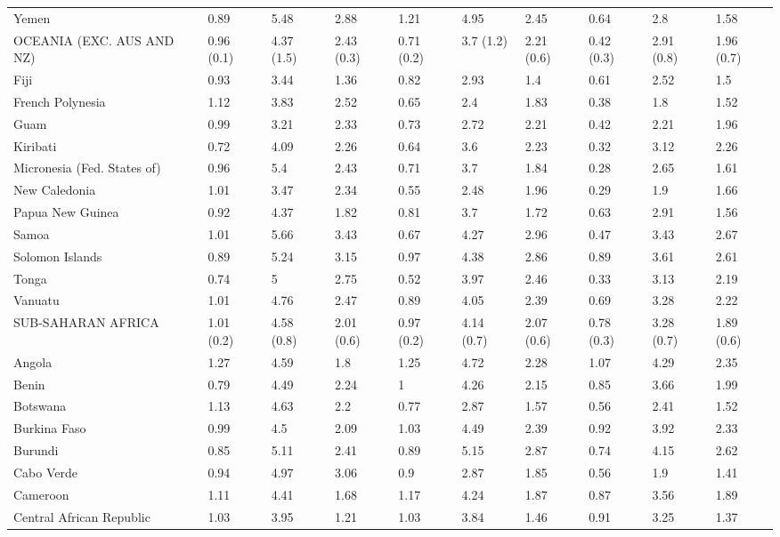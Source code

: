 \begin{longtable}[t]{llllllllll}
Yemen & 0.89 & 5.48 & 2.88 & 1.21 & 4.95 & 2.45 & 0.64 & 2.8 & 1.58\\
OCEANIA (EXC. AUS AND NZ) & 0.96 (0.1) & 4.37 (1.5) & 2.43 (0.3) & 0.71 (0.2) & 3.7 (1.2) & 2.21 (0.6) & 0.42 (0.3) & 2.91 (0.8) & 1.96 (0.7)\\
Fiji & 0.93 & 3.44 & 1.36 & 0.82 & 2.93 & 1.4 & 0.61 & 2.52 & 1.5\\
French Polynesia & 1.12 & 3.83 & 2.52 & 0.65 & 2.4 & 1.83 & 0.38 & 1.8 & 1.52\\
Guam & 0.99 & 3.21 & 2.33 & 0.73 & 2.72 & 2.21 & 0.42 & 2.21 & 1.96\\
Kiribati & 0.72 & 4.09 & 2.26 & 0.64 & 3.6 & 2.23 & 0.32 & 3.12 & 2.26\\
Micronesia (Fed. States of) & 0.96 & 5.4 & 2.43 & 0.71 & 3.7 & 1.84 & 0.28 & 2.65 & 1.61\\
New Caledonia & 1.01 & 3.47 & 2.34 & 0.55 & 2.48 & 1.96 & 0.29 & 1.9 & 1.66\\
Papua New Guinea & 0.92 & 4.37 & 1.82 & 0.81 & 3.7 & 1.72 & 0.63 & 2.91 & 1.56\\
Samoa & 1.01 & 5.66 & 3.43 & 0.67 & 4.27 & 2.96 & 0.47 & 3.43 & 2.67\\
Solomon Islands & 0.89 & 5.24 & 3.15 & 0.97 & 4.38 & 2.86 & 0.89 & 3.61 & 2.61\\
Tonga & 0.74 & 5 & 2.75 & 0.52 & 3.97 & 2.46 & 0.33 & 3.13 & 2.19\\
Vanuatu & 1.01 & 4.76 & 2.47 & 0.89 & 4.05 & 2.39 & 0.69 & 3.28 & 2.22\\
SUB-SAHARAN AFRICA & 1.01 (0.2) & 4.58 (0.8) & 2.01 (0.6) & 0.97 (0.2) & 4.14 (0.7) & 2.07 (0.6) & 0.78 (0.3) & 3.28 (0.7) & 1.89 (0.6)\\
Angola & 1.27 & 4.59 & 1.8 & 1.25 & 4.72 & 2.28 & 1.07 & 4.29 & 2.35\\
Benin & 0.79 & 4.49 & 2.24 & 1 & 4.26 & 2.15 & 0.85 & 3.66 & 1.99\\
Botswana & 1.13 & 4.63 & 2.2 & 0.77 & 2.87 & 1.57 & 0.56 & 2.41 & 1.52\\
Burkina Faso & 0.99 & 4.5 & 2.09 & 1.03 & 4.49 & 2.39 & 0.92 & 3.92 & 2.33\\
Burundi & 0.85 & 5.11 & 2.41 & 0.89 & 5.15 & 2.87 & 0.74 & 4.15 & 2.62\\
Cabo Verde & 0.94 & 4.97 & 3.06 & 0.9 & 2.87 & 1.85 & 0.56 & 1.9 & 1.41\\
Cameroon & 1.11 & 4.41 & 1.68 & 1.17 & 4.24 & 1.87 & 0.87 & 3.56 & 1.89\\
Central African Republic & 1.03 & 3.95 & 1.21 & 1.03 & 3.84 & 1.46 & 0.91 & 3.25 & 1.37\\

\end{longtable}

